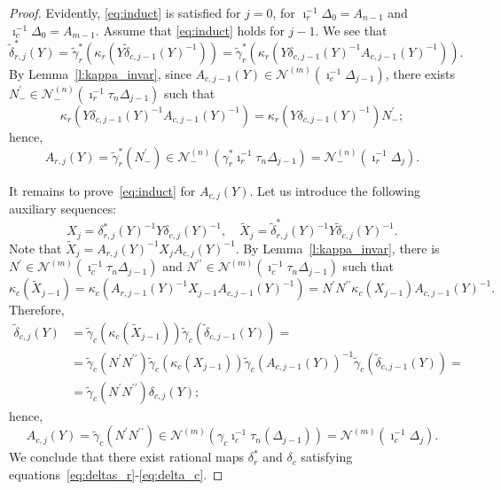 \documentclass[11pt]{article}
\theoremstyle{definition}\newtheorem{definition}[theorem]{Definition}
\theoremstyle{definition}\newtheorem{remark}[theorem]{Remark}
\theoremstyle{remark}
\numberwithin{equation}{section}
\begin{document}
\begin{proof}
    Evidently, \eqref{eq:induct} is satisfied for $j = 0$, for $\imath_r^{-1}\Delta_{0} = A_{n-1}$ and $\imath_c^{-1}\Delta_{0} = A_{m-1}$. Assume that \eqref{eq:induct} holds for $j-1$. We see that
    \begin{equation*}
        \tilde{\delta}_{r,j}^*(Y) = \tilde{\gamma}_r^*(\kappa_r(Y \tilde{\delta}_{c,j-1}(Y)^{-1})) = \tilde{\gamma}_r^*(\kappa_r(Y\delta_{c,j-1}(Y)^{-1} A_{c,j-1}(Y)^{-1})).
    \end{equation*}
    By Lemma~\ref{l:kappa_invar}, since $A_{c,j-1}(Y) \in \mathcal{N}^{(m)}(\imath_c^{-1}\Delta_{j-1})$, there exists $N^\prime_- \in \mathcal{N}^{(n)}_-(\imath_r^{-1}\tau_n\Delta_{j-1})$ such that
    \begin{equation*}
        \kappa_r(Y\delta_{c,j-1}(Y)^{-1} A_{c,j-1}(Y)^{-1}) = \kappa_r(Y\delta_{c,j-1}(Y)^{-1})N^\prime_-;
    \end{equation*}
    hence,
    \begin{equation*}
        A_{r,j}(Y) = \tilde{\gamma}_r^*(N^\prime_-) \in \mathcal{N}^{(n)}_-(\gamma_r^*\imath_r^{-1}\tau_n\Delta_{j-1}) = \mathcal{N}^{(n)}_-(\imath_r^{-1}\Delta_{j}).
    \end{equation*}

    It remains to prove~\eqref{eq:induct} for $A_{c,j}(Y)$. Let us introduce the following auxiliary sequences:
    \begin{equation*}
        X_j = \delta_{r,j}^*(Y)^{-1}Y\delta_{c,j}(Y)^{-1}, \quad \tilde{X}_j = \tilde{\delta}_{r,j}^*(Y)^{-1}Y\tilde{\delta}_{c,j}(Y)^{-1}.
    \end{equation*}
    Note that $\tilde{X}_j = A_{r,j}(Y)^{-1}X_j A_{c,j}(Y)^{-1}$. By Lemma~\ref{l:kappa_invar}, there is $N^\prime \in \mathcal{N}^{(m)}(\imath_c^{-1}\tau_n \Delta_{j-1})$ and $N^{\prime\prime} \in \mathcal{N}^{(m)}(\imath_c^{-1}\tau_n\Delta_{j-1})$ such that
    \begin{equation*}
        \kappa_c(\tilde{X}_{j-1}) = \kappa_c(A_{r,j-1}(Y)^{-1}X_{j-1}A_{c,j-1}(Y)^{-1}) = N^{\prime}N^{\prime\prime} \kappa_c(X_{j-1})A_{c,j-1}(Y)^{-1}.
    \end{equation*}
    Therefore,
    \begin{equation*}\begin{split}
        \tilde{\delta}_{c,j}(Y) &= \tilde{\gamma}_c(\kappa_c(\tilde{X}_{j-1}))\tilde{\gamma}_c(\tilde{\delta}_{c,j-1}(Y)) = \\ &= \tilde{\gamma}_c(N^\prime N^{\prime\prime}) \tilde{\gamma}_c(\kappa_c(X_{j-1}))\tilde{\gamma}_c(A_{c,j-1}(Y))^{-1}\tilde{\gamma}_c(\tilde{\delta}_{c,j-1}(Y)) = \\ &=\tilde{\gamma}_c(N^\prime N^{\prime\prime}) \delta_{c,j}(Y);
        \end{split}
    \end{equation*}
    hence,
    \begin{equation*}
        A_{c,j}(Y) = \tilde{\gamma}_c(N^\prime N^{\prime\prime}) \in \mathcal{N}^{(m)}(\gamma_c\imath_c^{-1}\tau_n(\Delta_{j-1})) = \mathcal{N}^{(m)}(\imath_c^{-1}\Delta_{j}).
    \end{equation*}
    We conclude that there exist rational maps $\delta_r^*$ and $\delta_c$ satisfying equations~\eqref{eq:deltas_r}-\eqref{eq:delta_c}.


\end{proof}
\end{document}

